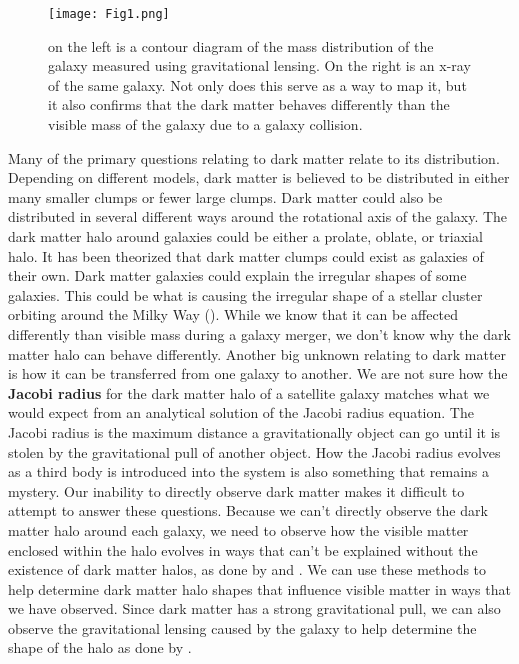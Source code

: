 \documentclass[fleqn,usenatbib]{mnras}
\begin{document}
\begin{figure}
                \centering
                \texttt{[image: Fig1.png]}
                \label{fig:enter-label}
            \caption{on the left is a contour diagram of the mass distribution of the galaxy measured using gravitational lensing. On the right is an x-ray of the same galaxy. Not only does this serve as a way to map it, but it also confirms that the dark matter behaves differently than the visible mass of the galaxy due to a galaxy collision.}
            \end{figure}
                        
        Many of the primary questions relating to dark matter relate to its distribution. Depending on different models, dark matter is believed to be distributed in either many smaller clumps or fewer large clumps. Dark matter could also be distributed in several different ways around the rotational axis of the galaxy. The dark matter halo around galaxies could be either a prolate, oblate, or triaxial halo. It has been theorized that dark matter clumps could exist as galaxies of their own. Dark matter galaxies could explain the irregular shapes of some galaxies. This could be what is causing the irregular shape of a stellar cluster orbiting around the Milky Way (\citet{Erkal2017}). While we know that it can be affected differently than visible mass during a galaxy merger, we don't know why the dark matter halo can behave differently. Another big unknown relating to dark matter is how it can be transferred from one galaxy to another. We are not sure how the \textbf{Jacobi radius} for the dark matter halo of a satellite galaxy matches what we would expect from an analytical solution of the Jacobi radius equation. The Jacobi radius is the maximum distance a gravitationally object can go until it is stolen by the gravitational pull of another object. How the Jacobi radius evolves as a third body is introduced into the system is also something that remains a mystery. Our inability to directly observe dark matter makes it difficult to attempt to answer these questions. Because we can't directly observe the dark matter halo around each galaxy, we need to observe how the visible matter enclosed within the halo evolves in ways that can't be explained without the existence of dark matter halos, as done by \citet{Clowe2006} and \citet{Erkal2017}. We can use these methods to help determine dark matter halo shapes that influence visible matter in ways that we have observed. Since dark matter has a strong gravitational pull, we can also observe the gravitational lensing caused by the galaxy to help determine the shape of the halo as done by \citet{Clowe2006}.
\end{document}
